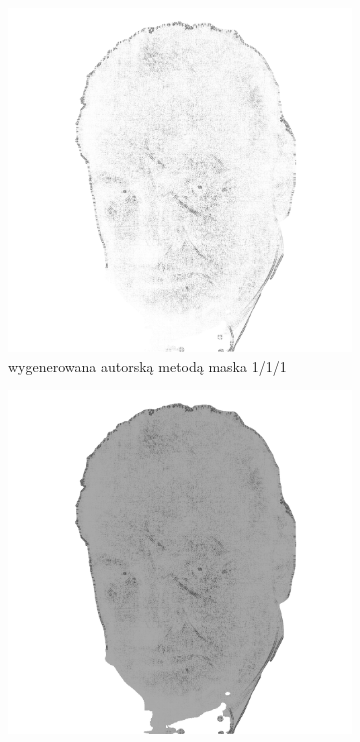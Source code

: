 \begin{figure}[H]
\begin{subfigure}{0.24\textwidth}
            \includegraphics[width = \textwidth]{img/6-comp/churchill_mask_c20_inv0_bg1_obj1_ed1.png}
            \caption{wygenerowana autorską metodą maska 1/1/1}
            \label{comp-comp-churchill-c}
        \end{subfigure}
        \begin{subfigure}{0.24\textwidth}
            \centering
            \includegraphics[width = \textwidth]{img/6-comp/churchill_mask_c20_inv0_bg1_obj2_ed1.png}

\end{subfigure}
\end{figure}

